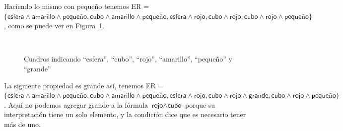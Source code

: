 Haciendo lo mismo con \textsf{peque\~no} tenemos ER = $\{\textsf{esfera} \wedge \textsf{amarillo} \wedge \textsf{peque\~no}, \textsf{cubo} \wedge \textsf{amarillo} \wedge \textsf{peque\~no}, \textsf{esfera} \wedge \textsf{rojo}, \textsf{cubo} \wedge \textsf{rojo}, \textsf{cubo} \wedge \textsf{rojo} \wedge \textsf{peque\~no}\}$, como se puede ver en Figura~\ref{fig-modelo11}.

%

\begin{figure}[ht]
\begin{center}
\\[0pt]
\caption{Cuadros indicando ``esfera'', ``cubo'', ``rojo'', ``amarillo'', ``peque\~no'' y ``grande''}
\label{fig-modelo11}
\end{center}
\end{figure}

La siguiente propiedad es \textsf{grande} as\'i, tenemos ER = $\{\textsf{esfera} \wedge \textsf{amarillo} \wedge \textsf{peque\~no}, \textsf{cubo} \wedge \textsf{amarillo} \wedge \textsf{peque\~no}, \textsf{esfera} \wedge \textsf{rojo}, \textsf{cubo} \wedge \textsf{rojo} \wedge \textsf{grande}, \textsf{cubo} \wedge \textsf{rojo} \wedge \textsf{peque\~no}\}$. Aqu\'i no podemos agregar \textsf{grande} a la f\'ormula $\textsf{rojo} \wedge \textsf{cubo}$ porque su interpretaci\'on tiene un solo elemento, y la condici\'on dice que es necesario tener m\'as de uno.

